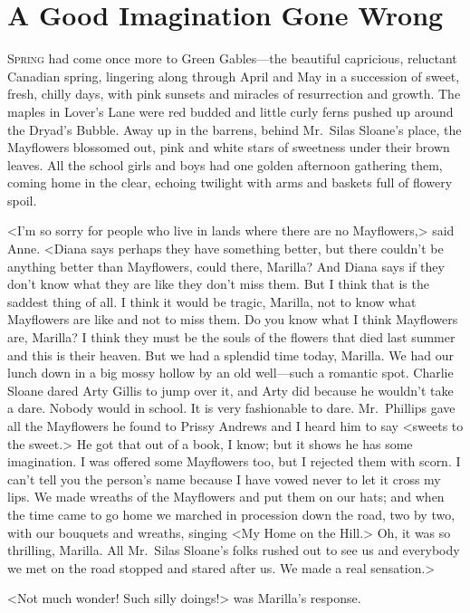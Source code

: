 \chapter{A Good Imagination Gone Wrong}

\lettrine{S}{pring} had come once more to Green Gables—the beautiful capricious, reluctant Canadian spring, lingering along through April and May in a succession of sweet, fresh, chilly days, with pink sunsets and miracles of resurrection and growth. The maples in Lover's Lane were red budded and little curly ferns pushed up around the Dryad's Bubble. Away up in the barrens, behind Mr.~Silas Sloane's place, the Mayflowers blossomed out, pink and white stars of sweetness under their brown leaves. All the school girls and boys had one golden afternoon gathering them, coming home in the clear, echoing twilight with arms and baskets full of flowery spoil.

<I'm so sorry for people who live in lands where there are no Mayflowers,> said Anne. <Diana says perhaps they have something better, but there couldn't be anything better than Mayflowers, could there, Marilla? And Diana says if they don't know what they are like they don't miss them. But I think that is the saddest thing of all. I think it would be tragic, Marilla, not to know what Mayflowers are like and not to miss them. Do you know what I think Mayflowers are, Marilla? I think they must be the souls of the flowers that died last summer and this is their heaven. But we had a splendid time today, Marilla. We had our lunch down in a big mossy hollow by an old well—such a romantic spot. Charlie Sloane dared Arty Gillis to jump over it, and Arty did because he wouldn't take a dare. Nobody would in school. It is very fashionable to dare. Mr.~Phillips gave all the Mayflowers he found to Prissy Andrews and I heard him to say <sweets to the sweet.> He got that out of a book, I know; but it shows he has some imagination. I was offered some Mayflowers too, but I rejected them with scorn. I can't tell you the person's name because I have vowed never to let it cross my lips. We made wreaths of the Mayflowers and put them on our hats; and when the time came to go home we marched in procession down the road, two by two, with our bouquets and wreaths, singing <My Home on the Hill.> Oh, it was so thrilling, Marilla. All Mr.~Silas Sloane's folks rushed out to see us and everybody we met on the road stopped and stared after us. We made a real sensation.>

<Not much wonder! Such silly doings!> was Marilla's response.

